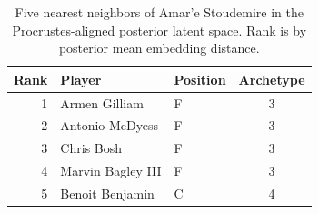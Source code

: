\begin{table}[htbp]
  \centering\small
  \begin{tabular}{rllc}
    \toprule
    Rank & Player & Position & Archetype \\
    \midrule
    1 & Armen Gilliam & F & 3 \\
    2 & Antonio McDyess & F & 3 \\
    3 & Chris Bosh & F & 3 \\
    4 & Marvin Bagley III & F & 3 \\
    5 & Benoit Benjamin & C & 4 \\
    \bottomrule
  \end{tabular}
  \caption{Five nearest neighbors of Amar'e Stoudemire in the Procrustes-aligned posterior latent space. Rank is by posterior mean embedding distance.}
  \label{tab:Amar_e_Stoudemire_neighbors}
\end{table}


